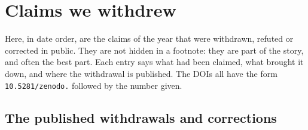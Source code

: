 \chapter{Claims we withdrew}

Here, in date order, are the claims of the year that were withdrawn, refuted or corrected in public. They are not
hidden in a footnote: they are part of the story, and often the best part. Each entry says what had been claimed,
what brought it down, and where the withdrawal is published. The DOIs all have the form \texttt{10.5281/zenodo.}
followed by the number given.

\section{The published withdrawals and corrections}

